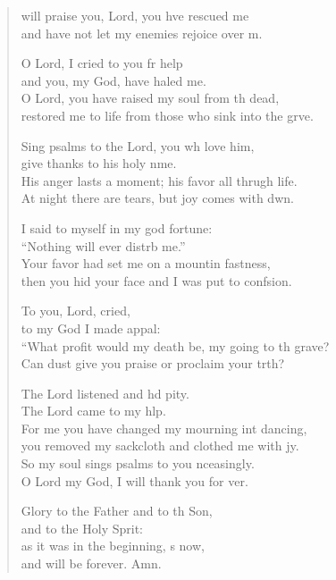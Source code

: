 \begin{verse}
  \begin{patverse}
 will praise you, Lord, you hve rescued me\Med\\
and have not let my enemies rejoice over m.

O Lord, I cried to you fr help\Med\\
and you, my God, have haled me.\\
O Lord, you have raised my soul from th dead,\Med\\
restored me to life from those who sink into the grve.

Sing psalms to the Lord, you wh love him,\Med\\
give thanks to his holy nme.\\
His anger lasts a moment; his favor all thrugh life.\Med\\
At night there are tears, but joy comes with dwn.

I said to myself in my god fortune:\Med\\
“Nothing will ever distrb me.”\\
Your favor had set me on a mountin fastness,\Med\\
then you hid your face and I was put to confsion.

To you, Lord,  cried,\Med\\
to my God I made appal:\\
“What profit would my death be, my going to th grave?\Med\\
Can dust give you praise or proclaim your trth?

The Lord listened and hd pity.\Med\\
The Lord came to my hlp.\\
For me you have changed my mourning int dancing,\Med\\
you removed my sackcloth and clothed me with jy.\\
So my soul sings psalms to you nceasingly.\Med\\
O Lord my God, I will thank you for ver.

Glory to the Father and to th Son,\Med\\
and to the Holy Sp\pointup{\i}rit:\\
as it was in the beginning, \pointup{\i}s now,\Med\\
and will be forever. Amn. 
  \end{patverse}
\end{verse}
